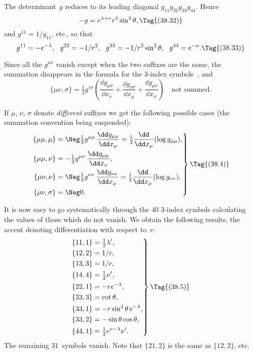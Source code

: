 \documentclass[12pt]{book}
\begin{document}
The determinant~$g$ reduces to its leading diagonal $g_{11} g_{22} g_{33} g_{44}$. Hence
\[
-g = e^{\lambda + \nu} r^{4} \sin^{2}\theta,
\Tag{(38.32)}
\]
and $g^{11} = 1/g_{11}$, etc., so that
\[
g^{11} = -e^{-\lambda},\ \
g^{22} = -1/r^{2},\ \
g^{33} = -1/r^{2} \sin^{2}\theta,\ \
g^{44} = e^{-\nu}.
\Tag{(38.33)}
\]

Since all the $g^{\mu\nu}$ vanish except when the two suffixes are the same, the
summation disappears in the formula for the $3$-index symbols~, and
\[
\{\mu\nu, \sigma\}
= \tfrac{1}{2} g^{\tau\sigma}\left(
  \frac{\dd g_{\mu\sigma}}{\dd x_{\nu}}
+ \frac{\dd g_{\nu\sigma}}{\dd x_{\mu}}
+ \frac{\dd g_{\mu\nu}}{\dd x_{\sigma}}
\right)\quad\text{not summed.}
\]
\PageSep{84}

If $\mu$, $\nu$, $\sigma$ denote \emph{different} suffixes we get the following possible cases (the
summation convention being suspended):
\[
\left.
\begin{aligned}
  \{\mu\mu, \mu\}
  &= \Neg\tfrac{1}{2} g^{\mu\mu}\, \frac{\dd g_{\mu\mu}}{\dd x_{\mu}}
  = \tfrac{1}{2} \frac{\dd}{\dd x_{\mu}} (\log g_{\mu\mu}), \\
  \{\mu\mu, \nu\}
  &= -\tfrac{1}{2} g^{\mu\nu}\, \frac{\dd g_{\mu\mu}}{\dd x_{\nu}}, \\
  \{\mu\nu, \nu\}
  &= \Neg\tfrac{1}{2} g^{\nu\nu}\, \frac{\dd g_{\nu\nu}}{\dd x_{\mu}}
  = \tfrac{1}{2} \frac{\dd}{\dd x_{\mu}} (\log g_{\nu\nu}), \\
  \{\mu\nu, \sigma\}
  &= \Neg0.
\end{aligned}\right\}
\Tag{(38.4)}
\]

It is now easy to go systematically through the $40$ $3$-index symbols calculating
the values of those which do not vanish. We obtain the following
results, the accent denoting differentiation with respect to~$r$:
\[
\left.
\begin{aligned}
\{11, 1\} &= \tfrac{1}{2} \lambda', \\
\{12, 2\} &= 1/r, \\
\{13, 3\} &= 1/r, \\
\{14, 4\} &= \tfrac{1}{2} \nu', \\
\{22, 1\} &= -re^{-\lambda}, \\
\{23, 3\} &= \cot\theta, \\
\{33, 1\} &= -r\sin^{2}\theta\, e^{-\lambda}, \\
\{33, 2\} &= -\sin\theta \cos\theta, \\
\{44, 1\} &= \tfrac{1}{2} e^{\nu-\lambda} \nu'.
\end{aligned}
\right\}
\Tag{(38.5)}
\]
The remaining $31$~symbols vanish. Note that $\{21, 2\}$ is the same as $\{12, 2\}$, etc.
\end{document}
